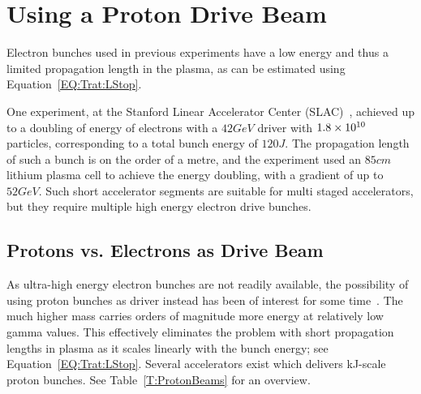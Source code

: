 \section{Using a Proton Drive Beam}
\label{Int:DBeam}

Electron bunches used in previous experiments have a low energy and thus a limited propagation length in the plasma, as can be estimated using Equation~\ref{EQ:Trat:LStop}.

One experiment, at the Stanford Linear Accelerator Center (SLAC)~\cite{blumenfeld:2007}, achieved up to a doubling of energy of electrons with a $42\unit{GeV}$ driver with $1.8\times 10^{10}$ particles, corresponding to a total bunch energy of $120\unit{J}$.
The propagation length of such a bunch is on the order of a metre, and the experiment used an $85\unit{cm}$ lithium plasma cell to achieve the energy doubling, with a gradient of up to $52\unit{GeV}$.
Such short accelerator segments are suitable for multi staged accelerators, but they require multiple high energy electron drive bunches. 

\subsection{Protons vs. Electrons as Drive Beam}
\label{Int:DBeam:PDPWFA}

As ultra-high energy electron bunches are not readily available, the possibility of using proton bunches as driver instead has been of interest for some time~\cite{blue:2003,caldwell:2009}.
The much higher mass carries orders of magnitude more energy at relatively low gamma values.
This effectively eliminates the problem with short propagation lengths in plasma as it scales linearly with the bunch energy; see Equation~\ref{EQ:Trat:LStop}.
Several accelerators exist which delivers kJ-scale proton bunches.
See Table~\ref{T:ProtonBeams} for an overview.

